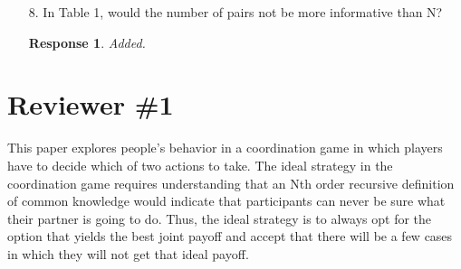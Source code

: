 \documentclass[a4paper]{article}
\newtheorem{response}{Response}
\newenvironment{tobo}{\smallskip \noindent \color{yellow!80!black!80}}{\color{black}\smallskip}
\begin{document}
\begin{enumerate}
  \item[8.]    In Table 1, would the number of pairs not be more informative than N? \begin{response}Added. \end{response}
\end{enumerate}  


\section*{Reviewer \#1}
This paper explores people's behavior in a coordination game in which players have to decide which of two actions to take. The ideal strategy in the coordination game requires understanding that an Nth order recursive definition of common knowledge would indicate that participants can never be sure what their partner is going to do. Thus, the ideal strategy is to always opt for the option that yields the best joint payoff and accept that there will be a few cases in which they will not get that ideal payoff. 
\end{document}

